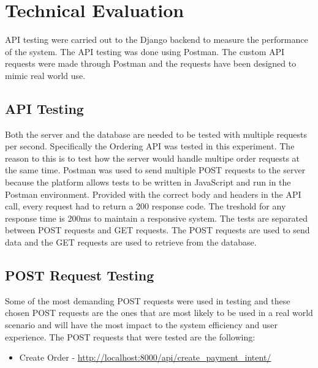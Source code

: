 \section{Technical Evaluation}
API testing were carried out to the Django backend to measure the performance of the system. The API testing was done using Postman. The custom API requests were made through Postman and the requests have been designed to mimic real world use.

\subsection{API Testing}
Both the server and the database are needed to be tested with multiple requests per second. Specifically the Ordering API was tested in this experiment. The reason to this is to test how the server would handle multipe order requests at the same time. Postman was used to send multiple POST requests to the server because the platform allows tests to be written in JavaScript and run in the Postman environment. Provided with the correct body and headers in the API call, every request had to return a 200 response code. The treshold for any response time is 200ms to maintain a responsive system. The tests are separated between POST requests and GET requests. The POST requests are used to send data and the GET requests are used to retrieve from the database.

\subsection{POST Request Testing}
Some of the most demanding POST requests were used in testing and these chosen POST requests are the ones that are most likely to be used in a real world scenario and will have the most impact to the system efficiency and user experience. The POST requests that were tested are the following:
\begin{itemize}
    \item Create Order - \url{http://localhost:8000/api/create_payment_intent/}
    
\end{itemize}
